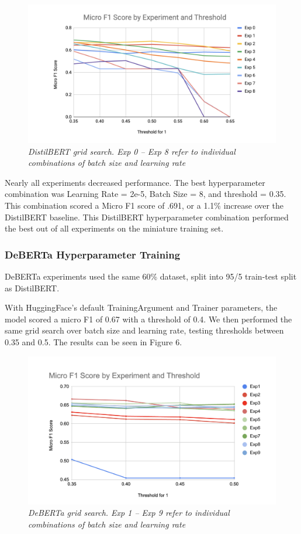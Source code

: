 \documentclass[11pt]{article}
\begin{document}
\begin{figure}
    \centering
    \includegraphics[width=\columnwidth]{distil_testing}
    \caption{\textit{DistilBERT grid search. Exp 0 – Exp 8 refer to individual combinations of batch size and learning rate}}
\end{figure}

Nearly all experiments decreased performance. The best hyperparameter combination was Learning Rate = 2e-5, Batch Size = 8, and threshold = 0.35. This combination scored a Micro F1 score of .691, or a 1.1\% increase over the DistilBERT baseline. This DistilBERT hyperparameter combination performed the best out of all experiments on the miniature training set.


\subsubsection{DeBERTa Hyperparameter Training}

DeBERTa experiments used the same 60\% dataset, split into 95/5 train-test split as DistilBERT.  

With HuggingFace’s default TrainingArgument and Trainer parameters, the model scored a micro F1 of 0.67 with a threshold of 0.4. We then performed the same grid search over batch size and learning rate, testing thresholds between 0.35 and 0.5. The results can be seen in Figure 6.

\begin{figure}
    \centering
    \includegraphics[width=\columnwidth]{debert_testing}
    \caption{\textit{DeBERTa grid search. Exp 1 – Exp 9 refer to individual combinations of batch size and learning rate}}
\end{figure}
\end{document}
